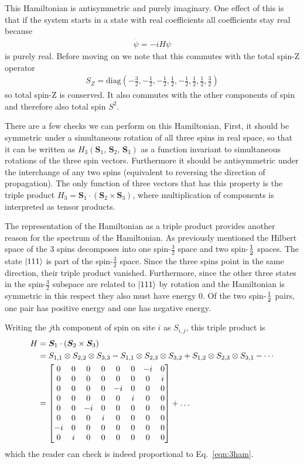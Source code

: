 This Hamiltonian is antisymmetric and purely imaginary. One effect of this is that if the system starts in a state with real coefficients all coefficients stay real because
\begin{align}
\dot{\psi}=-iH\psi
\end{align}
is purely real.
Before moving on we note that this commutes with the total spin-Z operator 
\begin{align}
S_Z = \text{diag}\left(-\frac{3}{2}, -\frac{1}{2}, -\frac{1}{2}, \frac{1}{2}, -\frac{1}{2}, \frac{1}{2}, \frac{1}{2}, \frac{3}{2}\right)
\end{align}
so total spin-Z is conserved. It also commutes with the other components of spin and therefore also total spin $S^2$.

There are a few checks we can perform on this Hamiltonian, First, it should be symmetric under a simultaneous rotation of all three spins in real space, so that it can be written as $H_3(\bm{S}_1,\,\bm{S}_2 ,\,\bm{S}_3)$ as a function invariant to simultaneous rotations of the three spin vectors. Furthermore it should be antisymmetric under the interchange of any two spins (equivalent to reversing the direction of propagation). The only function of three vectors that has this property is the triple product $H_3= \bm{S}_1\cdot\left(\bm{S}_2 \times\bm{S}_3\right)$, where multiplication of components is interpreted as tensor products.

The representation of the Hamiltonian as a triple product provides another reason for the spectrum of the Hamiltonian. As previously mentioned the Hilbert space of the 3 spins decomposes into one spin-$\frac{3}{2}$ space and two spin-$\frac{1}{2}$ spaces. The state $\left|111\right\rangle$ is part of the spin-$\frac{3}{2}$ space. Since the three spins point in the same direction, their triple product vanished. Furthermore, since the other three states in the spin-$\frac{3}{2}$ subspace are related to $\left|111\right\rangle$ by rotation and the Hamiltonian is symmetric in this respect they also must have energy 0. Of the two spin-$\frac{1}{2}$ pairs, one pair has positive energy and one has negative energy.

Writing the $j$th component of spin on site $i$ as $S_{i,j}$, this triple product is
\begin{align}
H &= \bm{S}_1\cdot\left(\bm{S}_2 \times\bm{S}_3\right) \nonumber\\
&= S_{1,1}\otimes S_{2,2}\otimes{S}_{3,3} - {S}_{1,1}
	\otimes S_{2,3}\otimes S_{3,2} + S_{1,2}\otimes{S}_{2,3} \otimes {S}_{3,1}-\cdots\nonumber\\
&= \begin{bmatrix}
	0 & 0 & 0 & 0 & 0 & 0 &-i & 0 \\
	0 & 0 & 0 & 0 & 0 & 0 & 0 & i \\
	0 & 0 & 0 & 0 &-i & 0 & 0 & 0 \\
	0 & 0 & 0 & 0 & 0 & i & 0 & 0 \\
	0 & 0 &-i & 0 & 0 & 0 & 0 & 0 \\
	0 & 0 & 0 & i & 0 & 0 & 0 & 0 \\
	-i& 0 & 0 & 0 & 0 & 0 & 0 & 0 \\
	0 & i & 0 & 0 & 0 & 0 & 0 & 0
	\end{bmatrix} + \dots
\end{align}
which the reader can check is indeed proportional to Eq.~\ref{eqn:3ham}.

